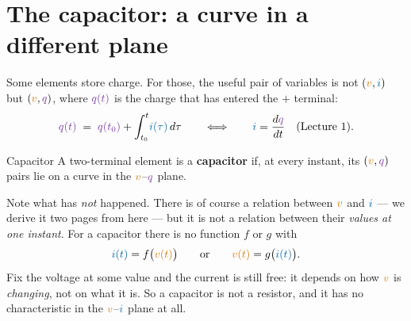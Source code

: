 \documentclass[11pt,a4paper]{article}
\newcommand{\Icol}[1]{\textcolor{ccur}{#1}}
\newcommand{\Vcol}[1]{\textcolor{cvolt}{#1}}
\newcommand{\Qcol}[1]{\textcolor{ccharge}{#1}}
\newcommand{\qvaxes}[3]{%
  \draw[vax] (-#1,0) -- (#1,0) node[right=1pt, font=\scriptsize, text=cvolt] {$v$};
  \draw[vax] (0,-#2) -- (0,#2) node[above=1pt, font=\scriptsize, text=ccharge] {$q$};
  \node[ttl] at (0,-#2-0.68) {#3};}
\begin{document}
\section{The capacitor: a curve in a different plane}

Some elements store charge. For those, the useful pair of variables is not
$(\Vcol{v},\Icol{i})$ but $(\Vcol{v},\Qcol{q})$, where $\Qcol{q(t)}$ is the charge that has
entered the $+$ terminal:
\[
  \Qcol{q(t)} \;=\; \Qcol{q(t_0)} + \int_{t_0}^{t}\!\Icol{i(\tau)}\,d\tau
  \qquad\Longleftrightarrow\qquad
  \Icol{i} = \frac{d\Qcol{q}}{dt} \quad\text{(Lecture 1)} .
\]

\begin{definitionbox}{Capacitor}
A two-terminal element is a \textbf{capacitor} if, at every instant, its
$(\Vcol{v},\Qcol{q})$ pairs lie on a curve in the $\Vcol{v}$--$\Qcol{q}$ plane.
\end{definitionbox}

\begin{center}
\end{center}
\vspace{2pt}

Note what has \emph{not} happened. There is of course a relation between $\Vcol{v}$ and
$\Icol{i}$ --- we derive it two pages from here --- but it is not a relation between their
\emph{values at one instant}. For a capacitor there is no function $f$ or $g$ with
\[
  \Icol{i(t)} = f\bigl(\Vcol{v(t)}\bigr)
  \qquad\text{or}\qquad
  \Vcol{v(t)} = g\bigl(\Icol{i(t)}\bigr) .
\]
Fix the voltage at some value and the current is still free: it depends on how $\Vcol{v}$
is \emph{changing}, not on what it is. So a capacitor is not a resistor, and it has no
characteristic in the $\Vcol{v}$--$\Icol{i}$ plane at all.
\end{document}

